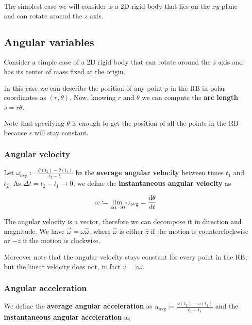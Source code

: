 \documentclass[12pt]{extarticle}
\begin{document}
The simplest case we will consider is a 2D rigid body that lies on the $xy$ plane and can rotate around the $z$ axis.

\subsection{Angular variables}

Consider a simple case of a 2D rigid body that can rotate around the $z$ axis and has its center of mass fixed at the origin.

In this case we can describe the position of any point $p$ in the RB in polar coordinates as $(r, \theta)$. Now, knowing $r$ and $\theta$ we can compute the \textbf{arc length} $s = r\theta$.

Note that specifying $\theta$ is enough to get the position of all the points in the RB because $r$ will stay constant.

\subsubsection{Angular velocity}

Let $\omega_{\text{avg}} \coloneq \frac{\theta(t_2) - \theta(t_1)}{t_2 - t_1}$ be the \textbf{average angular velocity} between times $t_1$ and $t_2$. As $\Delta t = t_2 - t_1 \to 0$, we define the \textbf{instantaneous angular velocity} as

\begin{equation}
    \omega \coloneq \lim_{\Delta t \to 0} \omega_{\text{avg}} = \dv{\theta}{t}
\end{equation}

The angular velocity is a vector, therefore we can decompose it in direction and magnitude. We have $\vec{\omega} = \omega \hat{\omega}$, where $\hat{\omega}$ is either $\hat{z}$ if the motion is counterclockwise or $-\hat{z}$ if the motion is clockwise.

Moreover note that the angular velocity stays constant for every point in the RB, but the linear velocity does not, in fact $v = r\omega$.

\subsubsection{Angular acceleration}

We define the \textbf{average angular acceleration} as $\alpha_{\text{avg}} \coloneq \frac{\omega(t_2) - \omega(t_1)}{t_2 - t_1}$ and the \textbf{instantaneous angular acceleration} as
\end{document}
